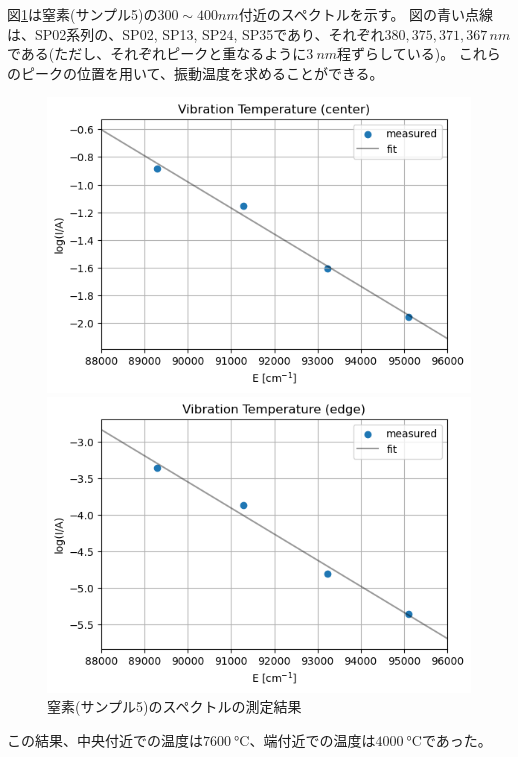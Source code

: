 \documentclass[a4paper]{ltjsarticle}
\begin{document}
図\ref{fig:spectrum_nitrogen}は窒素(サンプル5)の$300\sim400\si{nm}$付近のスペクトルを示す。
図の青い点線は、SP02系列の、SP02, SP13, SP24, SP35であり、それぞれ$380,  375, 371, 367\,\si{nm}$である(ただし、それぞれピークと重なるように$\SI{3}{nm}$程ずらしている)。
これらのピークの位置を用いて、振動温度を求めることができる。
\begin{figure}[htbp]
    \centering
    \begin{minipage}[c]{0.48\columnwidth}
        \centering
        \includegraphics[width=0.95\columnwidth]{./images/spectrum_N2_center_plot.png}
    \end{minipage}
    \begin{minipage}[c]{0.48\columnwidth}
        \centering
        \includegraphics[width=0.95\columnwidth]{./images/spectrum_N2_edge_plot.png}
    \end{minipage}
    \caption{窒素(サンプル5)のスペクトルの測定結果}
    \label{fig:spectrum_nitrogen}
\end{figure}
この結果、中央付近での温度は$\SI{7600}{\degreeCelsius}$、端付近での温度は$\SI{4000}{\degreeCelsius}$であった。
\end{document}
